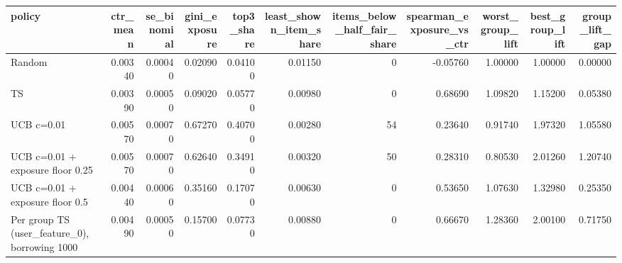 \begin{tabular}{lrrrrrrrrrr}
\toprule
policy & ctr\_mean & se\_binomial & gini\_exposure & top3\_share & least\_shown\_item\_share & items\_below\_half\_fair\_share & spearman\_exposure\_vs\_ctr & worst\_group\_lift & best\_group\_lift & group\_lift\_gap \\
\midrule
Random & 0.00340 & 0.00040 & 0.02090 & 0.04100 & 0.01150 & 0 & -0.05760 & 1.00000 & 1.00000 & 0.00000 \\
TS & 0.00390 & 0.00050 & 0.09020 & 0.05770 & 0.00980 & 0 & 0.68690 & 1.09820 & 1.15200 & 0.05380 \\
UCB c=0.01 & 0.00570 & 0.00070 & 0.67270 & 0.40700 & 0.00280 & 54 & 0.23640 & 0.91740 & 1.97320 & 1.05580 \\
UCB c=0.01 + exposure floor 0.25 & 0.00570 & 0.00070 & 0.62640 & 0.34910 & 0.00320 & 50 & 0.28310 & 0.80530 & 2.01260 & 1.20740 \\
UCB c=0.01 + exposure floor 0.5 & 0.00440 & 0.00060 & 0.35160 & 0.17070 & 0.00630 & 0 & 0.53650 & 1.07630 & 1.32980 & 0.25350 \\
Per group TS (user\_feature\_0), borrowing 1000 & 0.00490 & 0.00050 & 0.15700 & 0.07730 & 0.00880 & 0 & 0.66670 & 1.28360 & 2.00100 & 0.71750 \\
\bottomrule
\end{tabular}
